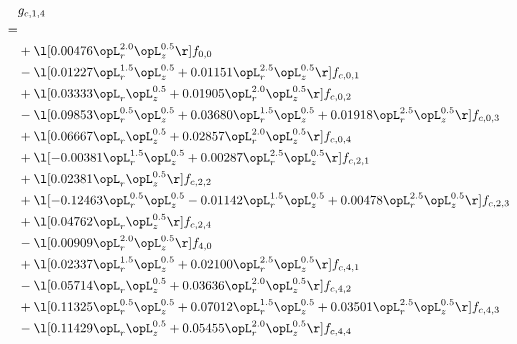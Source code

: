 \begin{alignat}{2} 
\label{eq:g_14_0} 
& g_{c,1,4} \nonumber \\ 
 = \\ 
& + \l[  0.00476 \opL_r^{2.0} \opL_z^{0.5}  \r] f_{0,0} \nonumber \\ 
& - \l[  0.01227 \opL_r^{1.5} \opL_z^{0.5} +  0.01151 \opL_r^{2.5} \opL_z^{0.5}  \r] f_{c,0,1} \nonumber \\ 
& + \l[  0.03333 \opL_r \opL_z^{0.5} +  0.01905 \opL_r^{2.0} \opL_z^{0.5}  \r] f_{c,0,2} \nonumber \\ 
& - \l[  0.09853 \opL_r^{0.5} \opL_z^{0.5} +  0.03680 \opL_r^{1.5} \opL_z^{0.5} +  0.01918 \opL_r^{2.5} \opL_z^{0.5}  \r] f_{c,0,3} \nonumber \\ 
& + \l[  0.06667 \opL_r \opL_z^{0.5} +  0.02857 \opL_r^{2.0} \opL_z^{0.5}  \r] f_{c,0,4} \nonumber \\ 
& + \l[  -0.00381 \opL_r^{1.5} \opL_z^{0.5} +  0.00287 \opL_r^{2.5} \opL_z^{0.5}  \r] f_{c,2,1} \nonumber \\ 
& + \l[  0.02381 \opL_r \opL_z^{0.5}  \r] f_{c,2,2} \nonumber \\ 
& + \l[  -0.12463 \opL_r^{0.5} \opL_z^{0.5}   -0.01142 \opL_r^{1.5} \opL_z^{0.5} +  0.00478 \opL_r^{2.5} \opL_z^{0.5}  \r] f_{c,2,3} \nonumber \\ 
& + \l[  0.04762 \opL_r \opL_z^{0.5}  \r] f_{c,2,4} \nonumber \\ 
& - \l[  0.00909 \opL_r^{2.0} \opL_z^{0.5}  \r] f_{4,0} \nonumber \\ 
& + \l[  0.02337 \opL_r^{1.5} \opL_z^{0.5} +  0.02100 \opL_r^{2.5} \opL_z^{0.5}  \r] f_{c,4,1} \nonumber \\ 
& - \l[  0.05714 \opL_r \opL_z^{0.5} +  0.03636 \opL_r^{2.0} \opL_z^{0.5}  \r] f_{c,4,2} \nonumber \\ 
& + \l[  0.11325 \opL_r^{0.5} \opL_z^{0.5} +  0.07012 \opL_r^{1.5} \opL_z^{0.5} +  0.03501 \opL_r^{2.5} \opL_z^{0.5}  \r] f_{c,4,3} \nonumber \\ 
& - \l[  0.11429 \opL_r \opL_z^{0.5} +  0.05455 \opL_r^{2.0} \opL_z^{0.5}  \r] f_{c,4,4} \nonumber \\ 
\end{alignat} 


